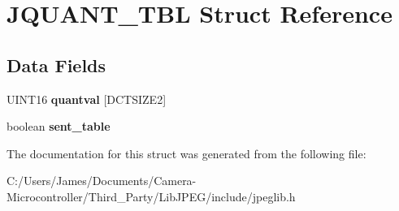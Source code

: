 \hypertarget{struct_j_q_u_a_n_t___t_b_l}{}\section{J\+Q\+U\+A\+N\+T\+\_\+\+T\+BL Struct Reference}
\label{struct_j_q_u_a_n_t___t_b_l}
\subsection*{Data Fields}
\begin{DoxyCompactItemize}
\item 
\mbox{\label{struct_j_q_u_a_n_t___t_b_l_a32df0afb821678a155df6d7474eb4a33}} 
U\+I\+N\+T16 {\bfseries quantval} \mbox{[}D\+C\+T\+S\+I\+Z\+E2\mbox{]}
\item 
\mbox{\label{struct_j_q_u_a_n_t___t_b_l_a80c1474699407698d9e13602c7287e38}} 
boolean {\bfseries sent\+\_\+table}
\end{DoxyCompactItemize}


The documentation for this struct was generated from the following file\+:\begin{DoxyCompactItemize}
\item 
C\+:/\+Users/\+James/\+Documents/\+Camera-\/\+Microcontroller/\+Third\+\_\+\+Party/\+Lib\+J\+P\+E\+G/include/jpeglib.\+h\end{DoxyCompactItemize}
